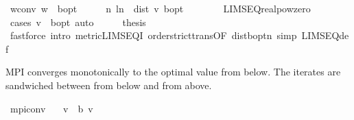 \begin{isabellebody}
\endisatagproof
{\isafoldproof}%
%
\isadelimproof
\isanewline
%
\endisadelimproof
\isanewline
{}\isamarkupfalse%
\ w{\isacharunderscore}{\kern0pt}conv{\isacharcolon}{\kern0pt}\ {\isachardoublequoteopen}w\ {\isasymlonglonglongrightarrow}\ {\isasymnu}\isactrlsub b{\isacharunderscore}{\kern0pt}opt{\isachardoublequoteclose}\isanewline
%
\isadelimproof
%
\endisadelimproof
%
\isatagproof
{}\isamarkupfalse%
\ {\isacharminus}{\kern0pt}\isanewline
\ \ \isamarkupfalse%
\ {\isachardoublequoteopen}{\isacharparenleft}{\kern0pt}{\isasymlambda}n{\isachardot}{\kern0pt}\ l{\isacharcircum}{\kern0pt}n\ {\isacharasterisk}{\kern0pt}\ dist\ v{}\ {\isasymnu}\isactrlsub b{\isacharunderscore}{\kern0pt}opt{\isacharparenright}{\kern0pt}\ {\isasymlonglonglongrightarrow}\ {}{\isachardoublequoteclose}\isanewline
\ \ \ \ \isamarkupfalse%
\ LIMSEQ{\isacharunderscore}{\kern0pt}realpow{\isacharunderscore}{\kern0pt}zero\isanewline
\ \ \ \ \isamarkupfalse%
\ {\isacharparenleft}{\kern0pt}cases\ {\isachardoublequoteopen}v{}\ {\isacharequal}{\kern0pt}\ {\isasymnu}\isactrlsub b{\isacharunderscore}{\kern0pt}opt{\isachardoublequoteclose}{\isacharparenright}{\kern0pt}\ auto\isanewline
\ \ \isamarkupfalse%
\ \isamarkupfalse%
\ {\isacharquery}{\kern0pt}thesis\isanewline
\ \ \ \ \isamarkupfalse%
\ {\isacharparenleft}{\kern0pt}fastforce\ intro{\isacharcolon}{\kern0pt}\ metric{\isacharunderscore}{\kern0pt}LIMSEQ{\isacharunderscore}{\kern0pt}I\ order{\isachardot}{\kern0pt}strict{\isacharunderscore}{\kern0pt}trans{}{\isacharbrackleft}{\kern0pt}OF\ dist{\isacharunderscore}{\kern0pt}{\isasymnu}\isactrlsub b{\isacharunderscore}{\kern0pt}opt{\isacharunderscore}{\kern0pt}n{\isacharbrackright}{\kern0pt}\ simp{\isacharcolon}{\kern0pt}\ LIMSEQ{\isacharunderscore}{\kern0pt}def{\isacharparenright}{\kern0pt}\isanewline
{}\isamarkupfalse%
%
\endisatagproof
{\isafoldproof}%
%
\isadelimproof
%
\endisadelimproof
%
\begin{isamarkuptext}%
MPI converges monotonically to the optimal value from below. 
  The iterates are sandwiched between  from below and  from above.%
\end{isamarkuptext}\isamarkuptrue%
\isamarkupfalse%
\ mpi{\isacharunderscore}{\kern0pt}conv{\isacharcolon}{\kern0pt}\isanewline
\ \ \ {\isachardoublequoteopen}v{}\ {\isasymle}\ {\isasymL}\isactrlsub b\ v{}{\isachardoublequoteclose}\isanewline

\end{isabellebody}
